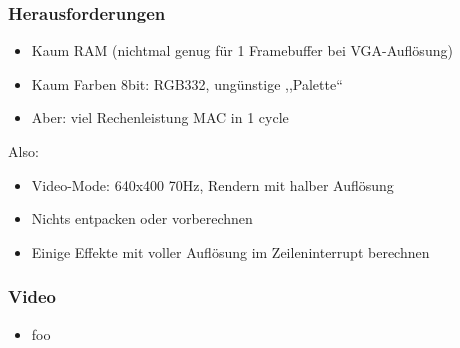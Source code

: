 \documentclass[t,14pt,aspectratio=169]{beamer}
\begin{document}
\begin{frame}
\frametitle{Herausforderungen}
\begin{itemize}
\item Kaum RAM {\small(nichtmal genug für 1 Framebuffer bei VGA-Auflösung)}
\item Kaum Farben {\small 8bit: RGB332, ungünstige ,,Palette``}

\item Aber: viel Rechenleistung {\small MAC in 1 cycle }
\end{itemize}
Also:
\begin{itemize}
\item Video-Mode: 640x400 70Hz, Rendern mit halber Auflösung
\item Nichts entpacken oder vorberechnen
\item Einige Effekte mit voller Auflösung im Zeileninterrupt berechnen
\end{itemize}
\end{frame}


\begin{frame}
\frametitle{Video}
\begin{itemize}

\item foo

\end{itemize}
\end{frame}
\end{document}
